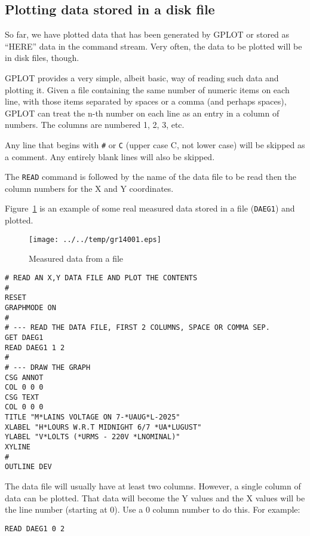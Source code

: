 \documentclass[a4paper,twoside,11pt]{article}
\makeatletter
\def\maxwidth{%
  \ifdim\Gin@nat@width>\linewidth
    \linewidth
  \else
    \Gin@nat@width
  \fi
}
\newcommand{\newpara}{\par\vspace{4mm}\noindent}
\makeatother
\begin{document}
\subsection{Plotting data stored in a disk file}\label{plotting-data-stored-in-a-disk-file}
\newpara
So far, we have plotted data that has been generated by GPLOT or stored
as ``HERE'' data in the command stream. Very often, the data to be
plotted will be in disk files, though.

\newpara
GPLOT provides a very simple, albeit basic, way of reading such data and
plotting it. Given a file containing the same number of numeric items on
each line, with those items separated by spaces or a comma (and perhaps
spaces), GPLOT can treat the n-th number on each line as an entry in a
column of numbers. The columns are numbered 1, 2, 3, etc.

\newpara
Any line that begins with \texttt{\#} or \texttt{C} (upper case C, not
lower case) will be skipped as a comment. Any entirely blank lines will
also be skipped.

\newpara
The \texttt{READ} command is followed by the name of the data file to be
read then the column numbers for the X and Y coordinates.

\newpara
Figure~\ref{fig:gr14001} is an example of some real measured data stored in a file
(\texttt{DAEG1}) and plotted.

\begin{figure}
  \centering
  \texttt{[image: ../../temp/gr14001.eps]}
  \caption{Measured data from a file}
  \label{fig:gr14001}
\end{figure}

\begin{lstlisting}
# READ AN X,Y DATA FILE AND PLOT THE CONTENTS
#
RESET
GRAPHMODE ON
#
# --- READ THE DATA FILE, FIRST 2 COLUMNS, SPACE OR COMMA SEP.
GET DAEG1
READ DAEG1 1 2
#
# --- DRAW THE GRAPH
CSG ANNOT
COL 0 0 0
CSG TEXT
COL 0 0 0
TITLE "M*LAINS VOLTAGE ON 7-*UAUG*L-2025"
XLABEL "H*LOURS W.R.T MIDNIGHT 6/7 *UA*LUGUST"
YLABEL "V*LOLTS (*URMS - 220V *LNOMINAL)"
XYLINE
#
OUTLINE DEV
\end{lstlisting}

\newpara
The data file will usually have at least two columns. However, a single
column of data can be plotted. That data will become the Y values and
the X values will be the line number (starting at 0). Use a 0 column
number to do this. For example:

\begin{lstlisting}
READ DAEG1 0 2
\end{lstlisting}
\end{document}
